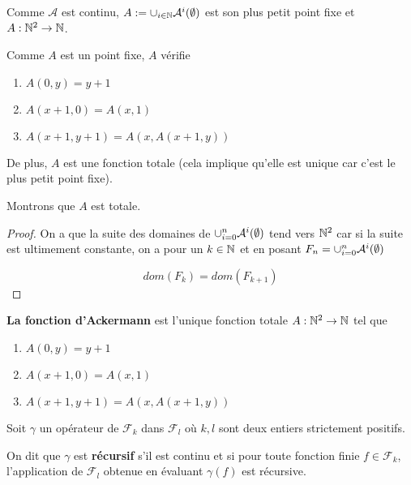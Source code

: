 Comme $\mathcal{A}$ est continu, $A := \cup_{i \in \mathbb{N}}
\mathcal{A}^{i}(\emptyset)$ est son plus petit point fixe et $A : \mathbb{N}^{2}
\rightarrow \mathbb{N}$.

Comme $A$ est un point fixe, $A$ vérifie
\begin{enumerate}
	\item $A(0, y) = y + 1$
	\item $A(x + 1, 0) = A(x, 1)$
	\item $A(x + 1, y + 1) = A(x, A(x + 1, y))$
\end{enumerate}

De plus, $A$ est une fonction totale (cela implique qu'elle est unique car c'est
le plus petit point fixe).

Montrons que $A$ est totale.
\ifdefined\outputproof
\begin{proof}
	On a que la suite des domaines de $\cup_{i = 0}^{n}
	\mathcal{A}^{i}(\emptyset)$ tend vers $\mathbb{N}^{2}$ car si la suite est
	ultimement constante, on a pour un $k \in \mathbb{N}$ et en posant $F_{n} =
	\cup_{i = 0}^{n} \mathcal{A}^{i}(\emptyset)$

	\begin{equation}
		dom(F_{k}) = dom(F_{k + 1})
	\end{equation}
\end{proof}
\fi

\begin{definition}
	\textbf{La fonction d'Ackermann} est l'unique fonction totale $A :
	\mathbb{N}^{2} \rightarrow \mathbb{N}$ tel que
	\begin{enumerate}
		\item $A(0, y) = y + 1$
		\item $A(x + 1, 0) = A(x, 1)$
		\item $A(x + 1, y + 1) = A(x, A(x + 1, y))$
	\end{enumerate}
\end{definition}

\begin{definition}
	Soit $\gamma$ un opérateur de $\mathcal{F}_{k}$ dans $\mathcal{F}_{l}$ où $k,
	l$ sont deux entiers strictement positifs.

	On dit que $\gamma$ est \textbf{récursif} s'il est continu et si pour toute fonction finie $f \in
	\mathcal{F}_{k}$, l'application de
	$\mathcal{F}_{l}$ obtenue en évaluant $\gamma(f)$ est récursive.
\end{definition}

